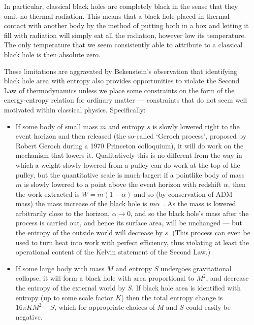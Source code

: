 \documentclass[12pt]{article}
\begin{document}
 In particular, classical black holes are completely black in the sense that they omit no thermal radiation. This means that a black hole placed in thermal contact with another body by the method of putting both in a box and letting it fill with radiation will simply eat all the radiation, however low its temperature. The only temperature that we seem consistently able to attribute to a classical black hole is then absolute zero.
 
These limitations are aggravated by Bekenstein's \citeyear{Bekenstein1973} observation that identifying black hole area with entropy also provides opportunities to violate the Second Law of thermodynamics unless we place some constraints on the form of the energy-entropy relation for ordinary matter --- constraints that do not seem well motivated within classical physics. Specifically:
 \begin{itemize}
 \item If some body of small mass $m$ and entropy $s$ is slowly lowered right to the event horizon and then released (the so-called `Geroch process', proposed by Robert Geroch during a 1970 Princeton colloquium), it will do work on the mechanism that lowers it. Qualitatively this is no different from the way in which a weight slowly lowered from a pulley can do work at the top of the pulley, but the quantitative scale is much larger: if a pointlike body of mass $m$ is slowly lowered to a point above the event horizon with redshift $\alpha$, then the work extracted is $W=m(1-\alpha)$ and so (by conservation of ADM mass) the mass increase of the black hole is $m\alpha$~\cite{unruhwald1982}. As the mass is lowered arbitrarily close to the horizon, $\alpha \rightarrow 0$, and so the black hole's mass after the process is carried out, and hence its surface area, will be unchanged --- but the entropy of the outside world will decrease by $s$. (This process can even be used to turn heat into work with perfect efficiency, thus violating at least the operational content of the Kelvin statement of the Second Law.)
 \item If some large body with mass $M$ and entropy $S$ undergoes gravitational collapse, it will form a black hole with area proportional to $M^2$, and decrease the entropy of the external world by $S$. If black hole area is identified with entropy (up to some scale factor $K$) then the total entropy change is $16 \pi KM^2 - S$, which for appropriate choices of $M$ and $S$ could easily be negative. \cite{susskindhologram}
 \end{itemize} 
 
\end{document}
